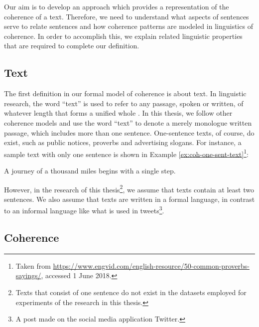 Our aim is to develop an approach which provides a representation of the coherence of a text. 
Therefore, we need to understand what aspects of sentences serve to relate sentences and how coherence patterns are modeled in linguistics of coherence. 
In order to accomplish this, we explain related linguistic properties that are required to complete our definition. 


\subsection{Text}

The first definition in our formal model of coherence is about text. 
In linguistic research, the word ``text'' is used to refer to any passage, spoken or written, of whatever length that forms a unified whole \cite{halliday76}. 
In this thesis, we follow other coherence models \cite{barzilay08,guinaudeau13} and use the word ``text'' to denote a merely monologue written passage, which includes more than one sentence.
One-sentence texts, of course, do exist, such as public notices, proverbs and advertising slogans.  
For instance, a sample text with only one sentence is shown in Example \ref{ex:coh-one-sent-text}\footnote{Taken from \url{https://www.engvid.com/english-resource/50-common-proverbs-sayings/}, accessed 1 June 2018.}: 

\begin{examples}
    \label{ex:coh-one-sent-text}
    A journey of a thousand miles begins with a single step.
\end{examples}

However, in the research of this thesis\footnote{Texts that consist of one sentence do not exist in the datasets employed for experiments of the research in this thesis.}, we assume that texts contain at least two sentences. 
We also assume that texts are written in a formal language, in contrast to an informal language like what is used in tweets\footnote{A post made on the social media application Twitter.}. 

\subsection{Coherence}

